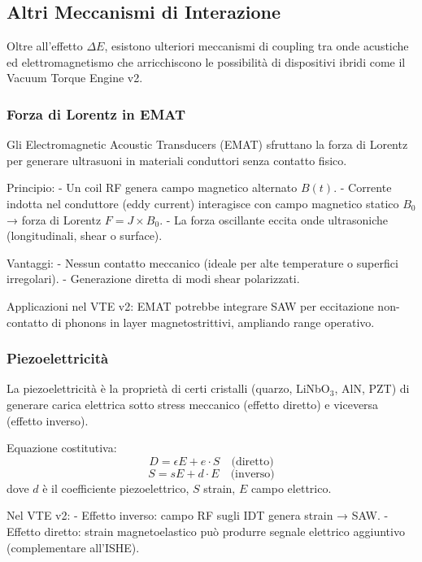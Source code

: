 \documentclass[11pt,a4paper]{article}
\begin{document}
\subsection{Altri Meccanismi di Interazione}

Oltre all'effetto $\Delta E$, esistono ulteriori meccanismi di coupling tra onde acustiche ed elettromagnetismo che arricchiscono le possibilità di dispositivi ibridi come il Vacuum Torque Engine v2.

\subsubsection{Forza di Lorentz in EMAT}

Gli Electromagnetic Acoustic Transducers (EMAT) sfruttano la forza di Lorentz per generare ultrasuoni in materiali conduttori senza contatto fisico.

Principio:
- Un coil RF genera campo magnetico alternato $B(t)$.
- Corrente indotta nel conduttore (eddy current) interagisce con campo magnetico statico $B_0$ → forza di Lorentz $F = J \times B_0$.
- La forza oscillante eccita onde ultrasoniche (longitudinali, shear o surface).

Vantaggi:
- Nessun contatto meccanico (ideale per alte temperature o superfici irregolari).
- Generazione diretta di modi shear polarizzati.

Applicazioni nel VTE v2: EMAT potrebbe integrare SAW per eccitazione non-contatto di phonons in layer magnetostrittivi, ampliando range operativo.

\subsubsection{Piezoelettricità}

La piezoelettricità è la proprietà di certi cristalli (quarzo, LiNbO$_3$, AlN, PZT) di generare carica elettrica sotto stress meccanico (effetto diretto) e viceversa (effetto inverso).

Equazione costitutiva:
\begin{equation}
D = \epsilon E + e \cdot S \quad \text{(diretto)}
\end{equation}
\begin{equation}
S = s E + d \cdot E \quad \text{(inverso)}
\end{equation}
dove $d$ è il coefficiente piezoelettrico, $S$ strain, $E$ campo elettrico.

Nel VTE v2:
- Effetto inverso: campo RF sugli IDT genera strain → SAW.
- Effetto diretto: strain magnetoelastico può produrre segnale elettrico aggiuntivo (complementare all'ISHE).
\end{document}
